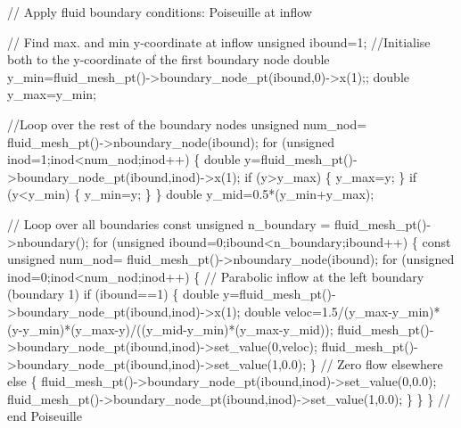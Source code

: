 \begin{DoxyCodeInclude}


 \textcolor{comment}{// Apply fluid boundary conditions: Poiseuille at inflow}

 \textcolor{comment}{// Find max. and min y-coordinate at inflow}
 \textcolor{keywordtype}{unsigned} ibound=1;
 \textcolor{comment}{//Initialise both to the y-coordinate of the first boundary node}
 \textcolor{keywordtype}{double} y\_min=fluid\_mesh\_pt()->boundary\_node\_pt(ibound,0)->x(1);;
 \textcolor{keywordtype}{double} y\_max=y\_min;

 \textcolor{comment}{//Loop over the rest of the boundary nodes}
 \textcolor{keywordtype}{unsigned} num\_nod= fluid\_mesh\_pt()->nboundary\_node(ibound);
 \textcolor{keywordflow}{for} (\textcolor{keywordtype}{unsigned} inod=1;inod<num\_nod;inod++)
  \{
   \textcolor{keywordtype}{double} y=fluid\_mesh\_pt()->boundary\_node\_pt(ibound,inod)->x(1);
   \textcolor{keywordflow}{if} (y>y\_max)
    \{
     y\_max=y;
    \}
   \textcolor{keywordflow}{if} (y<y\_min)
    \{
     y\_min=y;
    \}
  \}
 \textcolor{keywordtype}{double} y\_mid=0.5*(y\_min+y\_max);
 
 \textcolor{comment}{// Loop over all boundaries}
 \textcolor{keyword}{const} \textcolor{keywordtype}{unsigned} n\_boundary = fluid\_mesh\_pt()->nboundary();
 \textcolor{keywordflow}{for} (\textcolor{keywordtype}{unsigned} ibound=0;ibound<n\_boundary;ibound++)
  \{
   \textcolor{keyword}{const} \textcolor{keywordtype}{unsigned} num\_nod= fluid\_mesh\_pt()->nboundary\_node(ibound);
   \textcolor{keywordflow}{for} (\textcolor{keywordtype}{unsigned} inod=0;inod<num\_nod;inod++)
    \{
     \textcolor{comment}{// Parabolic inflow at the left boundary (boundary 1)}
     \textcolor{keywordflow}{if} (ibound==1)
      \{
       \textcolor{keywordtype}{double} y=fluid\_mesh\_pt()->boundary\_node\_pt(ibound,inod)->x(1);
       \textcolor{keywordtype}{double} veloc=1.5/(y\_max-y\_min)*
        (y-y\_min)*(y\_max-y)/((y\_mid-y\_min)*(y\_max-y\_mid));
       fluid\_mesh\_pt()->boundary\_node\_pt(ibound,inod)->set\_value(0,veloc);
       fluid\_mesh\_pt()->boundary\_node\_pt(ibound,inod)->set\_value(1,0.0);
      \}
     \textcolor{comment}{// Zero flow elsewhere }
     \textcolor{keywordflow}{else}
      \{
       fluid\_mesh\_pt()->boundary\_node\_pt(ibound,inod)->set\_value(0,0.0);
       fluid\_mesh\_pt()->boundary\_node\_pt(ibound,inod)->set\_value(1,0.0);
      \}
    \}
  \} \textcolor{comment}{// end Poiseuille}

\end{DoxyCodeInclude}


